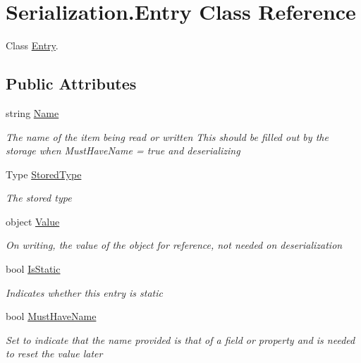 \hypertarget{class_serialization_1_1_entry}{}\section{Serialization.\+Entry Class Reference}
\label{class_serialization_1_1_entry}


Class \hyperlink{class_serialization_1_1_entry}{Entry}.  


\subsection*{Public Attributes}
\begin{DoxyCompactItemize}
\item 
string \hyperlink{class_serialization_1_1_entry_a27386eb83718b39bfc36c67585639247}{Name}
\begin{DoxyCompactList}\small\item\em The name of the item being read or written This should be filled out by the storage when Must\+Have\+Name = true and deserializing \end{DoxyCompactList}\item 
Type \hyperlink{class_serialization_1_1_entry_a4654173d7df1c387d25517dcf2393a4f}{Stored\+Type}
\begin{DoxyCompactList}\small\item\em The stored type \end{DoxyCompactList}\item 
object \hyperlink{class_serialization_1_1_entry_a17a664469636a801c96b7224972cf928}{Value}
\begin{DoxyCompactList}\small\item\em On writing, the value of the object for reference, not needed on deserialization \end{DoxyCompactList}\item 
bool \hyperlink{class_serialization_1_1_entry_aa2f98ee039ca25cefe57774a76903556}{Is\+Static}
\begin{DoxyCompactList}\small\item\em Indicates whether this entry is static \end{DoxyCompactList}\item 
bool \hyperlink{class_serialization_1_1_entry_a09a13ff1f6b299c4728a734b307de2b5}{Must\+Have\+Name}
\begin{DoxyCompactList}\small\item\em Set to indicate that the name provided is that of a field or property and is needed to reset the value later \end{DoxyCompactList}\item 

\end{DoxyCompactItemize}
